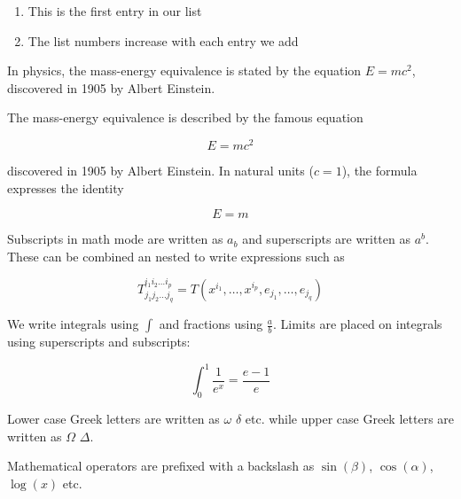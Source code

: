 \documentclass[12pt, letterpaper]{article}
\begin{document}
\begin{enumerate}
    \item This is the first entry in our list
    \item The list numbers increase with each entry we add
\end{enumerate}

\newpage

In physics, the mass-energy equivalence is stated
by the equation $E=mc^2$, discovered in 1905 by Albert Einstein.

The mass-energy equivalence is described by the famous equation

\[E=mc^2\]

discovered in 1905 by Albert Einstein.
In natural units ($c = 1$), the formula expresses the identity

\begin{equation}
E=m
\end{equation}

Subscripts in math mode are written as $a_b$ and superscripts are written as $a^b$. These can be combined an nested to write expressions such as

$$T^{i_1 i_2 \dots i_p}_{j_1 j_2 \dots j_q} = T(x^{i_1},\dots,x^{i_p},e_{j_1},\dots,e_{j_q})$$

We write integrals using $\int$ and fractions using $\frac{a}{b}$. Limits are placed on integrals using superscripts and subscripts:

$$\int_0^1 \frac{1}{e^x} =  \frac{e-1}{e}$$

Lower case Greek letters are written as $\omega$ $\delta$ etc. while upper case Greek letters are written as $\Omega$ $\Delta$.

Mathematical operators are prefixed with a backslash as $\sin(\beta)$, $\cos(\alpha)$, $\log(x)$ etc.

\newpage
\end{document}
